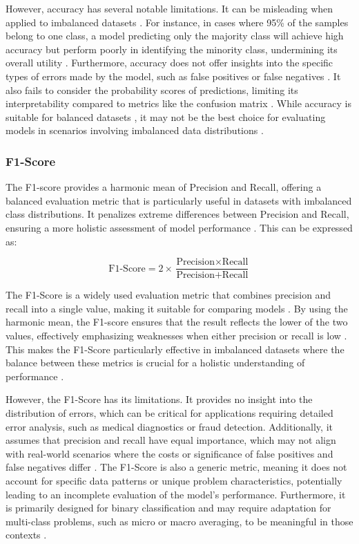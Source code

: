 However, accuracy has several notable limitations. It can be misleading when applied to imbalanced datasets . For instance, in cases where 95\% of the samples belong to one class, a model predicting only the majority class will achieve high accuracy but perform poorly in identifying the minority class, undermining its overall utility \cite{appliedai_evaluation_metrics}. Furthermore, accuracy does not offer insights into the specific types of errors made by the model, such as false positives or false negatives \cite{bose_classification_metrics}. It also fails to consider the probability scores of predictions, limiting its interpretability compared to metrics like the confusion matrix \cite{bose_classification_metrics}. While accuracy is suitable for balanced datasets \cite{cohere_classification_metrics,duong_ml_evaluation_metrics}, it may not be the best choice for evaluating models in scenarios involving imbalanced data distributions \cite{duong_ml_evaluation_metrics}.

\subsubsection{F1-Score}
The F1-score provides a harmonic mean of Precision and Recall, offering a balanced evaluation metric that is particularly useful in datasets with imbalanced class distributions. It penalizes extreme differences between Precision and Recall, ensuring a more holistic assessment of model performance \cite{article}. This can be expressed as: 

\begin{equation}
    \text{F1-Score} = 2 \times \frac{\text{Precision} \times \text{Recall}}{\text{Precision} + \text{Recall}}
\end{equation}


The F1-Score is a widely used evaluation metric that combines precision and recall into a single value, making it suitable for comparing models \cite{serokell_f1_score_guide}. By using the harmonic mean, the F1-score ensures that the result reflects the lower of the two values, effectively emphasizing weaknesses when either precision or recall is low \cite{bose_classification_metrics}. This makes the F1-Score particularly effective in imbalanced datasets where the balance between these metrics is crucial for a holistic understanding of performance \cite{appliedai_evaluation_metrics}.

However, the F1-Score has its limitations. It provides no insight into the distribution of errors, which can be critical for applications requiring detailed error analysis, such as medical diagnostics or fraud detection. Additionally, it assumes that precision and recall have equal importance, which may not align with real-world scenarios where the costs or significance of false positives and false negatives differ . The F1-Score is also a generic metric, meaning it does not account for specific data patterns or unique problem characteristics, potentially leading to an incomplete evaluation of the model's performance. Furthermore, it is primarily designed for binary classification and may require adaptation for multi-class problems, such as micro or macro averaging, to be meaningful in those contexts \cite{serokell_f1_score_guide}.

